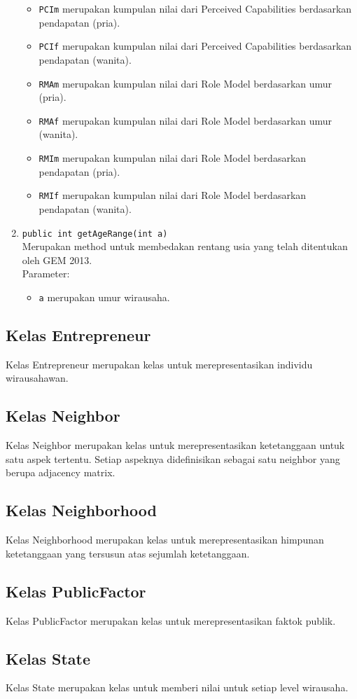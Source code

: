 \begin{enumerate}
\begin{itemize}
				\item \texttt{PCIm} merupakan kumpulan nilai dari Perceived Capabilities berdasarkan pendapatan (pria).
				\item \texttt{PCIf} merupakan kumpulan nilai dari Perceived Capabilities berdasarkan pendapatan (wanita).
				\item \texttt{RMAm} merupakan kumpulan nilai dari Role Model berdasarkan umur (pria).
				\item \texttt{RMAf} merupakan kumpulan nilai dari Role Model berdasarkan umur (wanita).
				\item \texttt{RMIm} merupakan kumpulan nilai dari Role Model berdasarkan pendapatan (pria).
				\item \texttt{RMIf} merupakan kumpulan nilai dari Role Model berdasarkan pendapatan (wanita).
			\end{itemize}
			
			\item \texttt{public int getAgeRange(int a)}\\
			Merupakan method untuk membedakan rentang usia yang telah ditentukan oleh GEM 2013.\cite{GEM2013}\\
			Parameter:
			\begin{itemize}
				\item \texttt{a} merupakan umur wirausaha.
			\end{itemize}
		\end{enumerate}
		
\subsection{Kelas Entrepreneur} 
	Kelas Entrepreneur merupakan kelas untuk merepresentasikan individu wirausahawan.
\subsection{Kelas Neighbor}
	Kelas Neighbor merupakan kelas untuk merepresentasikan ketetanggaan untuk satu aspek tertentu. Setiap aspeknya didefinisikan sebagai satu neighbor yang berupa adjacency matrix.
\subsection{Kelas Neighborhood}
	Kelas Neighborhood merupakan kelas untuk merepresentasikan himpunan ketetanggaan yang tersusun atas sejumlah ketetanggaan.
\subsection{Kelas PublicFactor}
	Kelas PublicFactor merupakan kelas untuk merepresentasikan faktok publik.
\subsection{Kelas State}
	Kelas State merupakan kelas untuk memberi nilai untuk setiap level wirausaha.


